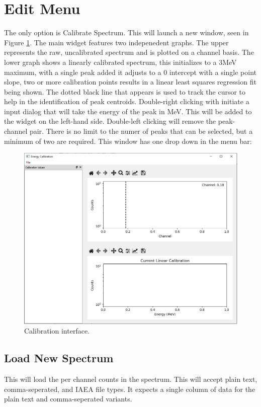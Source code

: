 \section{Edit Menu}
The only option is Calibrate Spectrum. This will launch a new window, seen in Figure \ref{fig:calibrate_window}. The main widget features two indepenedent graphs. The upper represents the raw, uncalibrated spectrum and is plotted on a channel basis. The lower graph shows a linearly calibrated spectrum, this initializes to a 3MeV maximum, with a single peak added it adjusts to a 0 intercept with a single point slope, two or more calibration points results in a linear least squares regression fit being shown. The dotted black line that appears is used to track the cursor to help in the identification of peak centroids. Double-right clicking with initiate a input dialog that will take the energy of the peak in MeV. This will be added to the widget on the left-hand side. Double-left clicking will remove the peak-channel pair. There is no limit to the numer of peaks that can be selected, but a minimum of two are required. This window has one drop down in the menu bar: 
\begin{figure}[h!]
	\centering
	\includegraphics[width=\linewidth]{Calibrate.png}
	\caption{Calibration interface.}
	\label{fig:calibrate_window}
\end{figure}


	\subsection{Load New Spectrum}
		This will load the per channel counts in the spectrum. This will accept plain text, comma-seperated, and IAEA file types. It expects a single column of data for the plain text and comma-seperated variants.

